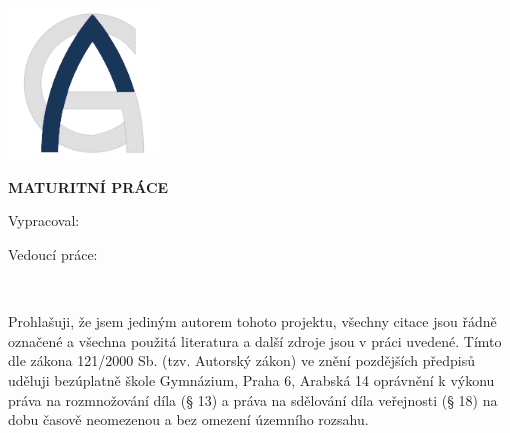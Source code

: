 
\pagestyle{empty}
\hypersetup{pageanchor=false}

\begin{center}

{\LARGE\bfseries\NazevSkoly}

\vspace{-18mm}
\vfill

{\LARGE\NazevOboru}

\vfill

\centerline{\mbox{\includegraphics[height=4cm]{../img/logo.png}}}

\vspace{-8mm}
\vfill

{\bf\Large MATURITNÍ PRÁCE}

\vfill


\vspace{15mm}

{\LARGE\bfseries\NazevPrace}


\vfill


Vypracoval: \hfill \AutorPrace

Vedoucí práce: \hfill \Vedouci

\vspace{15mm}
\MesicOdevzdani \ \RokOdevzdani

\end{center}



\newpage
\hypersetup{pageanchor=true}
\pagestyle{plain}


\openright


\vspace*{\fill}


\noindent
Prohlašuji, že jsem jediným autorem tohoto projektu, všechny citace jsou
řádně označené a všechna použitá literatura a další zdroje jsou v práci uvedené.
Tímto dle zákona 121/2000 Sb. (tzv. Autorský zákon) ve znění pozdějších předpisů uděluji
bezúplatně škole Gymnázium, Praha 6, Arabská 14 oprávnění k výkonu práva na rozmnožování díla
(§ 13) a práva na sdělování díla veřejnosti (§ 18) na dobu časově neomezenou a bez omezení
územního rozsahu.


